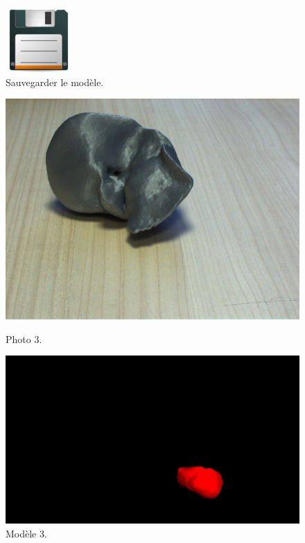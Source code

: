 \documentclass[12pt]{report}
\begin{document}
\begin{appendices}
\begin{figure}[H]
\centerline{\includegraphics[scale = 0.8]{img/icons/save.png}}
\caption{Sauvegarder le modèle.}
\label{save}
\end{figure}

\begin{figure}[H]
\centerline{\includegraphics[scale = 0.1]{img/Photo3.jpg}}
\caption{Photo 3.}
\endminipage\hfill
{}
\centerline{\includegraphics[scale = 0.22]{img/Model3.png}}
\caption{Modèle 3.}
\endminipage
\end{figure}


\end{appendices}
\end{document}
